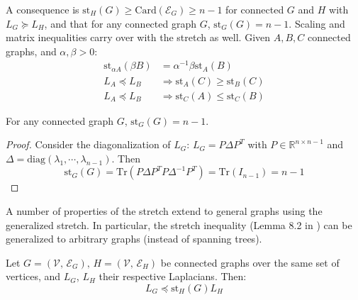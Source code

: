 A consequence is $\text{st}_{H}\left(G\right)\geq\text{Card}\left(\mathcal{E}_{G}\right)\geq n-1$
for connected $G$ and $H$ with $L_{G}\succeq L_{H}$, and that for
any connected graph $G$, $\text{st}_{G}\left(G\right)=n-1$. Scaling
and matrix inequalities carry over with the stretch as well. Given
$A,B,C$ connected graphs, and $\alpha,\beta>0$: 
\begin{align*}
\text{st}_{\alpha A}\left(\beta B\right) & =\alpha^{-1}\beta\text{st}_{A}\left(B\right)\\
L_{A}\preceq L_{B} & \Rightarrow\text{st}_{A}\left(C\right)\geq\text{st}_{B}\left(C\right)\\
L_{A}\preceq L_{B} & \Rightarrow\text{st}_{C}\left(A\right)\leq\text{st}_{C}\left(B\right)
\end{align*}

\begin{lemma}
For any connected graph $G$, $\text{st}_{G}\left(G\right)=n-1$.\end{lemma}
\begin{proof}
Consider the diagonalization of $L_{G}$: $L_{G}=P\Delta P^{T}$ with
$P\in\mathbb{R}^{n\times n-1}$ and $\Delta=\text{diag}\left(\lambda_{1},\cdots,\lambda_{n-1}\right)$.
Then 
\[
\text{st}_{G}\left(G\right)=\text{Tr}\left(P\Delta P^{T}P\Delta^{-1}P^{T}\right)=\text{Tr}\left(I_{n-1}\right)=n-1
\]

\end{proof}
A number of properties of the stretch extend to general graphs using
the generalized stretch. In particular, the stretch inequality (Lemma
8.2 in \cite{Spielman2009a}) can be generalized to arbitrary graphs
(instead of spanning trees). 
\begin{lemma}
\label{lem:stretch-inequality}Let $G=\left(\mathcal{V},\,\mathcal{E}_{G}\right),\, H=\left(\mathcal{V},\,\mathcal{E}_{H}\right)$
be connected graphs over the same set of vertices, and $L_{G}$, $L_{H}$
their respective Laplacians. Then: 
\[
L_{G}\preceq\text{st}_{H}\left(G\right)L_{H}
\]
\end{lemma}
